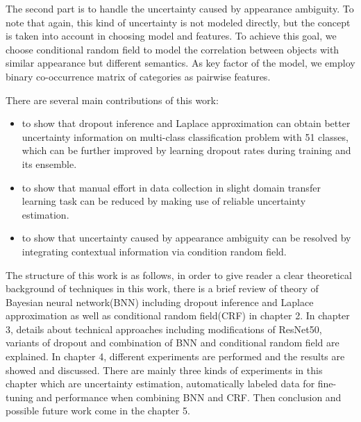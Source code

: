 The second part is to handle the uncertainty caused by appearance ambiguity. To note that again, this kind of uncertainty is not modeled directly, but the concept is taken into account in choosing model and features. To achieve this goal, we choose conditional random field to model the correlation between objects with similar appearance but different semantics. As key factor of the model, we employ binary co-occurrence matrix of categories as pairwise features.

There are several main contributions of this work:
\begin{itemize}
 \item to show that dropout inference and Laplace approximation can obtain better uncertainty information on multi-class classification problem with 51 classes, which can be further improved by learning dropout rates during training and its ensemble.
 
 \item to show that manual effort in data collection in slight domain transfer learning task can be reduced by making use of reliable uncertainty estimation.
 
 \item to show that uncertainty caused by appearance ambiguity can be resolved by integrating contextual information via condition random field.
 
 
\end{itemize}

The structure of this work is as follows, in order to give reader a clear theoretical background of techniques in this work, there is a brief review of theory of Bayesian neural network(BNN) including dropout inference and Laplace approximation as well as conditional random field(CRF) in chapter 2. In chapter 3, details about technical approaches including modifications of ResNet50, variants of dropout and combination of BNN and conditional random field are explained.  In chapter 4, different experiments are performed and the results are showed and discussed. There are mainly three kinds of experiments in this chapter which are uncertainty estimation, automatically labeled data for fine-tuning and performance when combining BNN and CRF. Then conclusion and possible future work come in the chapter 5.
